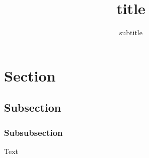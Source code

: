 \documentclass[a4paper,11pt]{article}
\title{title}
\subtitle{subtitle}
\begin{document}
\maketitlebox

\section{Section}
\subsection{Subsection}
\subsubsection{Subsubsection}
Text

%	
%	
\end{document}
